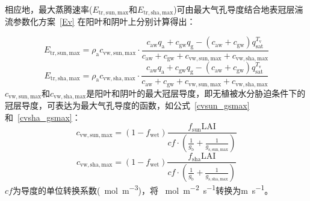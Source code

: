 相应地，最大蒸腾速率($E_{\mathrm{tr,sun,max}}$和$E_{\mathrm{tr,sha,max}}$)可由最大气孔导度结合地表冠层湍流参数化方案~\eqref{Ev} 在阳叶和阴叶上分别计算得出：

\begin{equation}\label{E_sunmax}
  E_{\mathrm{tr,sun,max}}=\rho_{\mathrm{a}} c_{\mathrm{vw,sun,max}} \cdot \frac{c_{\mathrm{aw}} q_{\mathrm{a}}+c_{\mathrm{gw}} q_{\mathrm{g}}-
  \left(c_{\mathrm{aw}}+c_{\mathrm{gw}}\right) q_{\mathrm{s a t}}^{T_{\mathrm{v}}}}{c_{\mathrm{aw}}+c_{\mathrm{gw}}+c_{\mathrm{vw,sun,max}}+c_{\mathrm{vw,sha,max}}}
\end{equation}
%
\begin{equation}\label{Eshamax}
  E_{\mathrm{tr,sha,max}}=\rho_{\mathrm{a}} c_{\mathrm{vw,sha,max}} \cdot \frac{c_{\mathrm{aw}} q_{\mathrm{a}}+c_{\mathrm{gw}} q_{\mathrm{g}}-
  \left(c_{\mathrm{aw}}+c_{\mathrm{gw}}\right) q_{\mathrm{s a t}}^{T_{\mathrm{v}}}}{c_{\mathrm{aw}}+c_{\mathrm{gw}}+c_{\mathrm{vw,sun,max}}+c_{\mathrm{vw,sha,max}}}
\end{equation}
%
%
$c_{\mathrm{vw,sun,max}}$和$c_{\mathrm{vw,sha,max}}$是阳叶和阴叶的最大冠层导度，即无植被水分胁迫条件下的冠层导度，可表达为最大气孔导度的函数，如公式~\eqref{cvsun_gsmax} 和~\eqref{cvsha_gsmax}：
\begin{equation}\label{cvsun_gsmax}
  c_{\mathrm{vw,sun,max}}=\left(1-f_{\mathrm{wet}}\right)\frac{f_{\mathrm{sun}}\text{LAI}}{cf\cdot\left(\frac{1}{g_{\mathrm {b}}}+\frac{1}{g_{\mathrm{s,sun,max}}}\right)}
\end{equation}
%
\begin{equation}\label{cvsha_gsmax}
  c_{\mathrm{vw,sha,max}}=\left(1-f_{\mathrm{wet}}\right)\frac{f_{\mathrm{sha}}\text{LAI}}{cf\cdot\left(\frac{1}{g_{\mathrm {b}}}+\frac{1}{g_{\mathrm{s,sha,max}}}\right)}
\end{equation}
$cf$为导度的单位转换系数(\unit{\mu mol.m^{-3}})，将 \unit{\mu mol.m^{-2}.s^{-1}}转换为\unit{m.s^{-1}}。

